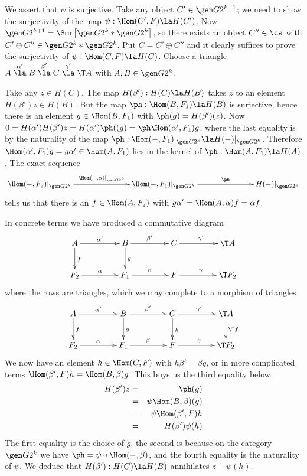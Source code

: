 \documentclass[11pt]{amsart}
\begin{document}
We assert that $\psi$ is surjective.
Take any object $C'\in\gen G{2^{k+1}}$; we need to
show the surjectivity of the map $\psi:\Hom(C',F)\la H(C')$.
Now $\gen G{2^{k+1}}=\Smr\big[\gen G{2^{k}}*\gen G{2^{k}}\big]$,
so there exists an object $C''\in\cs$ with
$C'\oplus C''\in\gen G{2^{k}}*\gen G{2^{k}}$. Put $C=C'\oplus C''$ and
it clearly suffices to prove the surjectivity
of $\psi:\Hom(C,F)\la H(C)$. Choose a triangle 
$A\stackrel{\alpha'}\la B\stackrel{\beta'}\la C\stackrel{\gamma'}\la \T A$
with $A,B\in\gen G{2^{k}}$.


Take any $z\in H(C)$. The map $H(\beta'):H(C)\la H(B)$ takes
$z$ to an element $H(\beta')z\in H(B)$.
But the map $\ph:\Hom(B,F_1)\la H(B)$ is surjective,
hence there is an element $g\in\Hom(B,F_1)$ with $\ph(g)=H(\beta')(z)$.
Now $0=H(\alpha')H(\beta')z=H(\alpha')\ph((g)=\ph\Hom(\alpha',F_1)g$,
where the last equality is by the naturality of the map
$\ph:\Hom(-,F_1)|_{\gen G{2^k}}\la H(-)|_{\gen G{2^k}}$. Therefore
$\Hom(\alpha',F_1)g=g\alpha'\in\Hom(A,F_1)$ lies in the kernel
of $\ph:\Hom(A,F_1)\la H(A)$. The exact
sequence
\[\xymatrix@C+50pt{
  \Hom(-,F_2)|_{\gen G{2^k}}  \ar[r]^-{\Hom(-,\alpha)|_{\gen G{2^k}}} &
  \Hom(-,F_1)|_{\gen G{2^k}} \ar[r]^-{\ph} &
  H(-)|_{\gen G{2^k}}
}\]
tells us that there is an $f\in\Hom(A,F_2)$ with
$g\alpha'=\Hom(A,\alpha)f=\alpha f$.

In concrete terms we have produced a commutative diagram
\[\xymatrix@C+20pt{
  A\ar[r]^{\alpha'}\ar[d]^f & B\ar[r]^{\beta'}\ar[d]^g & C
  \ar[r]^{\gamma'} & \T A\\
F_2\ar[r]^{\alpha} & F_1\ar[r]^{\beta} & F
  \ar[r]^{\gamma}& \T F_2
}\]
where the rows are triangles, which we may complete to
a morphism of triangles
\[\xymatrix@C+20pt{
  A\ar[r]^{\alpha'}\ar[d]^f & B\ar[r]^{\beta'}\ar[d]^g & C
  \ar[r]^{\gamma'}\ar[d]^h & \T A\ar[d]^{\T f}\\
F_2\ar[r]^{\alpha} & F_1\ar[r]^{\beta} & F
  \ar[r]^{\gamma}& \T F_2
}\]
We now have an element $h\in\Hom(C,F)$ with $h\beta'=\beta g$,
or in more complicated terms $\Hom(\beta',F)h=\Hom(B,\beta)g$. This
buys us the third equality below
\begin{eqnarray*}
  H(\beta')z &=& \ph(g) \\
  &=& \psi\Hom(B,\beta)(g) \\
  &=&\psi\Hom(\beta',F)h \\
  &=&H(\beta')\psi(h)
\end{eqnarray*}
The first equality is the choice of $g$, the second is because
on the category $\gen G{2^k}$ we have
$\ph=\psi\circ\Hom(-,\beta)$, and the fourth equality is the naturality of
$\psi$. We deduce that $H(\beta'):H(C)\la H(B)$ annihilates
$z-\psi(h)$.
\end{document}

